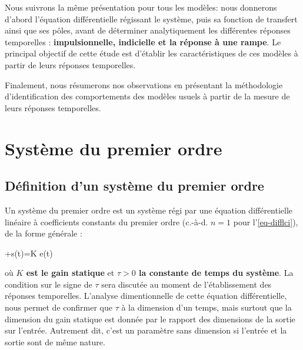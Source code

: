 Nous suivrons la même présentation pour tous les modèles: 
nous donnerons d'abord l'équation différentielle régissant le système, puis 
sa fonction de transfert ainsi que ses pôles, avant de 
déterminer analytiquement les différentes réponses temporelles : 
\textbf{impulsionnelle, indicielle et la réponse à une rampe}. 
Le principal objectif de cette étude est d'établir les caractéristiques 
de ces modèles à partir de leurs réponses temporelles.

Finalement, nous résumerons nos observations en présentant la méthodologie  
d'identification des comportements des modèles usuels à partir de la mesure
de leurs réponses temporelles.     
\section{Système du premier ordre}
\subsection{Définition d'un système du premier ordre}
Un système du premier ordre est un système régi par une équation
différentielle linéaire à coefficients constants du premier ordre 
(c.-à-d. $n=1$ pour l'\cref{eq-difflci}), de la forme générale :
\begin{bequation}
    \tau{}+s(t)=K e(t)\label{eq-1er}
\end{bequation}
où \textbf{$K$ est le gain statique} et \textbf{$\tau>0$ la constante de 
temps du système}. La condition sur le signe de $\tau$ sera 
discutée au moment de l'établissement des réponses temporelles.
L'analyse dimentionnelle de cette équation différentielle, nous permet 
de confirmer que $\tau$ à la dimension d'un temps, mais surtout que 
la dimension du gain statique est donnée par le rapport des dimensions de 
la sortie sur l'entrée. Autrement dit, c'est un paramètre sans dimension 
si l'entrée et la sortie sont de même nature.
\newpage

\captionsetup{width=0.9\linewidth}
